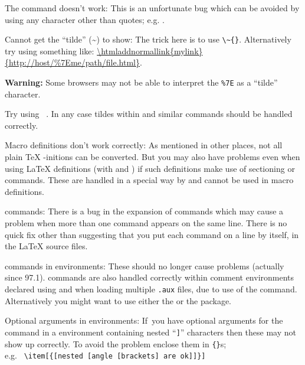 \begin{htmllist}
\item [The \Lc{verb"ABC"} command doesn't work: ]
This is an unfortunate bug which can be avoided by using 
any character other than quotes; e.g. .

\item [Cannot get the ``tilde'' (\~{}) to show: \hfill]
The trick here is to use \verb|\~{}|.\html{\\}
Alternatively try using something like:
\url{\htmladdnormallink{mylink}{http://host/\%7Eme/path/file.html}}. 

\textbf{Warning:} Some browsers may not be able to interpret the \verb|%7E|
as a ``tilde'' character.

Try using ~.
In any case tildes within  and similar commands
should be handled correctly.

\item [Macro definitions don't work correctly: ]
As mentioned in other places, not all plain \TeX{} -initions 
can be converted.
But you may also have problems even when using \LaTeX{} definitions
(with  and ) if such definitions
make use of sectioning or  commands. These are 
handled in a special way by \latextohtml{} and cannot be used in
macro definitions. 


\item [\Lc{input} commands: ]
There is a bug in the expansion of  commands which may cause
a problem when more than one  command appears on the same line.
There is no quick fix other than suggesting that you put each
 command on a line by itself, in the \LaTeX{} source files.

\item [\Lc{input} commands in \env{verbatim} environments: ]
These should no longer cause problems (actually since 97.1).
 commands are also handled correctly within comment environments
declared using  
and when loading multiple \texttt{.aux} files, 
due to use of the  command.
Alternatively you might want to use
either the  or the  package.

\item [Optional arguments in \env{description} environments: ]
If~you have optional arguments for the  command in 
a  environment containing nested ``\texttt{]}'' characters then 
these may not show up correctly. To avoid the problem enclose them
in \verb|{}|s;\\ e.g. \ \verb+\item[{[nested [angle [brackets] are ok]]}]+



\end{htmllist}
